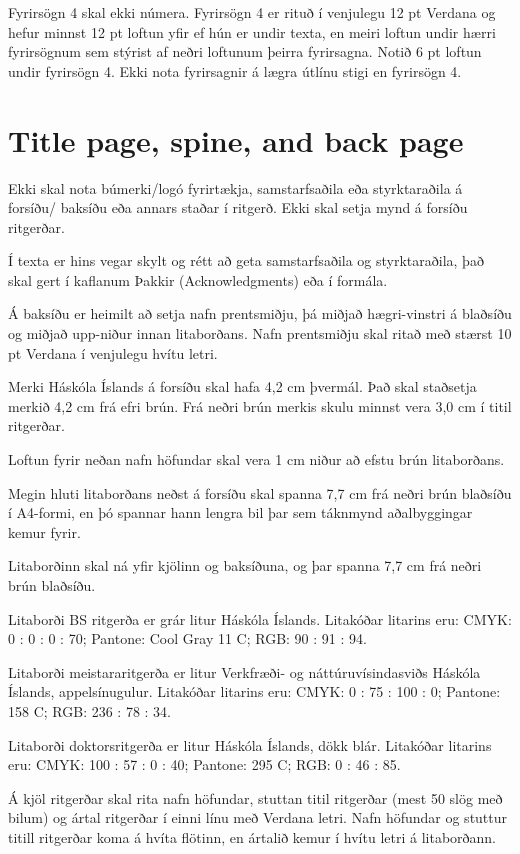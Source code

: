 \documentclass[a4paper,12pt,twoside,BCOR=10mm]{scrbook}
\begin{document}
Fyrirsögn 4 skal ekki númera. Fyrirsögn 4 er rituð í venjulegu 12 pt Verdana og hefur minnst 12 pt loftun yfir ef hún er undir texta, en meiri loftun undir hærri fyrirsögnum sem stýrist af neðri loftunum þeirra fyrirsagna. Notið 6 pt loftun undir fyrirsögn 4.
Ekki nota fyrirsagnir á lægra útlínu stigi en fyrirsögn 4.

\section{Title page, spine, and back page}
Ekki skal nota búmerki/logó fyrirtækja, samstarfsaðila eða styrktaraðila á forsíðu/ baksíðu eða annars staðar í ritgerð. Ekki skal setja mynd á forsíðu ritgerðar. 

Í texta er hins vegar skylt og rétt að geta samstarfsaðila og styrktaraðila, það skal gert í kaflanum Þakkir (Acknowledgments) eða í formála.

Á baksíðu er heimilt að setja nafn prentsmiðju, þá miðjað hægri-vinstri á blaðsíðu og miðjað upp-niður innan litaborðans. Nafn prentsmiðju skal ritað með stærst 10 pt Verdana í venjulegu hvítu letri.

Merki Háskóla Íslands á forsíðu skal hafa 4,2 cm þvermál. Það skal staðsetja merkið 4,2 cm frá efri brún. Frá neðri brún merkis skulu minnst vera 3,0 cm í titil ritgerðar.

Loftun fyrir neðan nafn höfundar skal vera 1 cm niður að efstu brún litaborðans.

Megin hluti litaborðans neðst á forsíðu skal spanna 7,7 cm frá neðri brún blaðsíðu í A4-formi, en þó spannar hann lengra bil þar sem táknmynd aðalbyggingar kemur fyrir.

Litaborðinn skal ná yfir kjölinn og baksíðuna, og þar spanna 7,7 cm frá neðri brún blaðsíðu.

Litaborði BS ritgerða er grár litur Háskóla Íslands. Litakóðar litarins eru: CMYK: 0 : 0 : 0 : 70; Pantone: Cool Gray 11 C; RGB: 90 : 91 : 94.

Litaborði meistararitgerða er litur Verkfræði- og náttúruvísindasviðs Háskóla Íslands, appelsínugulur. Litakóðar litarins eru: CMYK:  0 : 75 : 100 : 0; Pantone: 158 C; RGB: 236 : 78 : 34.

Litaborði doktorsritgerða er litur Háskóla Íslands, dökk blár. Litakóðar litarins eru: CMYK: 100 : 57 : 0 : 40; Pantone: 295 C; RGB: 0 : 46 : 85.

Á kjöl ritgerðar skal rita nafn höfundar, stuttan titil ritgerðar (mest 50 slög með bilum) og ártal ritgerðar í einni línu með Verdana letri. Nafn höfundar og stuttur titill ritgerðar koma á hvíta flötinn, en ártalið kemur í hvítu letri á litaborðann.
\end{document}
